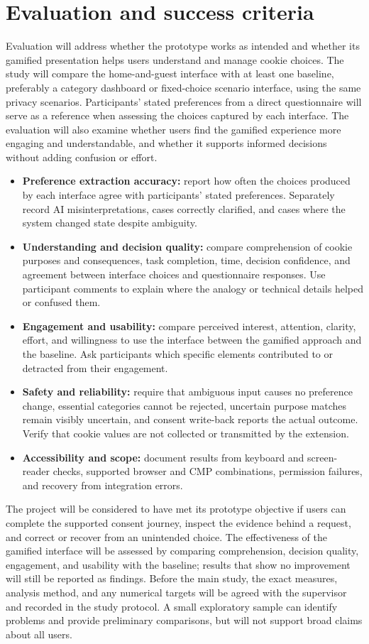 \documentclass[11pt,a4paper]{report}
\begin{document}
\section{Evaluation and success criteria}
Evaluation will address whether the prototype works as intended and whether its gamified presentation helps users understand and manage cookie choices. The study will compare the home-and-guest interface with at least one baseline, preferably a category dashboard or fixed-choice scenario interface, using the same privacy scenarios. Participants' stated preferences from a direct questionnaire will serve as a reference when assessing the choices captured by each interface. The evaluation will also examine whether users find the gamified experience more engaging and understandable, and whether it supports informed decisions without adding confusion or effort.
\begin{itemize}
  \item \textbf{Preference extraction accuracy:} report how often the choices produced by each interface agree with participants' stated preferences. Separately record AI misinterpretations, cases correctly clarified, and cases where the system changed state despite ambiguity.
  \item \textbf{Understanding and decision quality:} compare comprehension of cookie purposes and consequences, task completion, time, decision confidence, and agreement between interface choices and questionnaire responses. Use participant comments to explain where the analogy or technical details helped or confused them.
  \item \textbf{Engagement and usability:} compare perceived interest, attention, clarity, effort, and willingness to use the interface between the gamified approach and the baseline. Ask participants which specific elements contributed to or detracted from their engagement.
  \item \textbf{Safety and reliability:} require that ambiguous input causes no preference change, essential categories cannot be rejected, uncertain purpose matches remain visibly uncertain, and consent write-back reports the actual outcome. Verify that cookie values are not collected or transmitted by the extension.
  \item \textbf{Accessibility and scope:} document results from keyboard and screen-reader checks, supported browser and CMP combinations, permission failures, and recovery from integration errors.
\end{itemize}
The project will be considered to have met its prototype objective if users can complete the supported consent journey, inspect the evidence behind a request, and correct or recover from an unintended choice. The effectiveness of the gamified interface will be assessed by comparing comprehension, decision quality, engagement, and usability with the baseline; results that show no improvement will still be reported as findings. Before the main study, the exact measures, analysis method, and any numerical targets will be agreed with the supervisor and recorded in the study protocol. A small exploratory sample can identify problems and provide preliminary comparisons, but will not support broad claims about all users.
\end{document}
